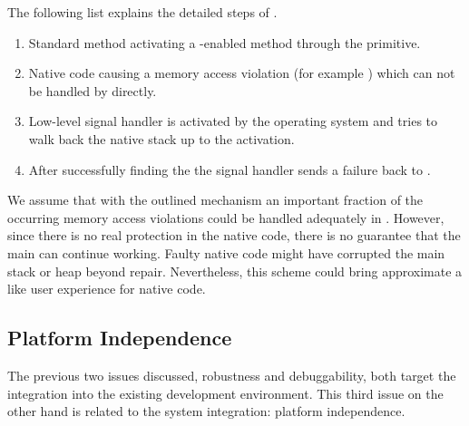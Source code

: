 The following list explains the detailed steps of .
\begin{enumerate}
	\item Standard \PH method activating a \B-enabled method through the  primitive.
	\item Native code causing a memory access violation (for example ) which can not be handled by \PH directly.
	\item Low-level signal handler is activated by the operating system and tries to walk back the native stack up to the  activation.
	\item After successfully finding the  the signal handler sends a \B failure back to \PH.
\end{enumerate}

\noindent We assume that with the outlined mechanism an important fraction of the occurring memory access violations could be handled adequately in \PH.
However, since there is no real protection in the native code, there is no guarantee that the main \PH \VM can continue working.
Faulty native code might have corrupted the main \PH stack or heap beyond repair.
Nevertheless, this scheme could bring approximate a \PH like user experience for native \B code.


\subsection{Platform Independence}
The previous two issues discussed, robustness and debuggability, both target the integration into the existing \PH development environment.
This third issue on the other hand is related to the system integration: platform independence.

